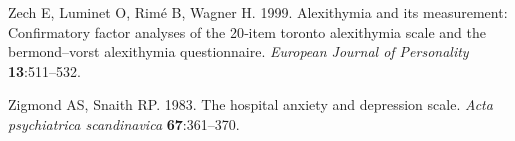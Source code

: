\documentclass[
]{article}
\newlength{\cslhangindent}
\newlength{\cslentryspacingunit} %
\newenvironment{CSLReferences}[2] %
 {%
  \setlength{\parindent}{0pt}
  \ifodd #1
  \let\oldpar\par
  \def\par{\hangindent=\cslhangindent\oldpar}
  \fi
  \setlength{\parskip}{#2\cslentryspacingunit}
 }%
 {}
\begin{document}
\begin{CSLReferences}{1}{0}
\leavevmode{}%
Zech E, Luminet O, Rimé B, Wagner H. 1999. Alexithymia and its measurement: Confirmatory factor analyses of the 20‐item toronto alexithymia scale and the bermond--vorst alexithymia questionnaire. \emph{European Journal of Personality} \textbf{13}:511--532.

\leavevmode{}%
Zigmond AS, Snaith RP. 1983. The hospital anxiety and depression scale. \emph{Acta psychiatrica scandinavica} \textbf{67}:361--370.

\end{CSLReferences}
\end{document}
